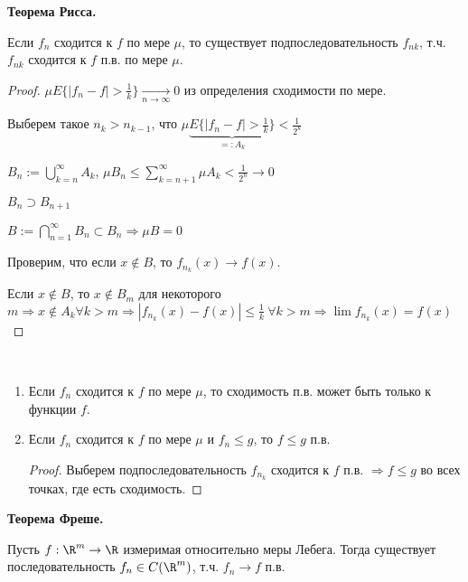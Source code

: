 \begin{theorem}
    \textbf{Теорема Рисса.}

    Если $f_n$ сходится к $f$ по мере $\mu$, то существует подпоследовательность
    $f_{nk}$, т.ч. $f_{nk}$  сходится к $f$ п.в. по мере $\mu$.
\end{theorem}

\begin{proof}
    $\mu E\{|f_n - f|> \frac{1}{k}\}\underset{n\rightarrow \infty}{\rightarrow}0$
    из определения сходимости по мере.

    Выберем такое $n_k>n_{k-1}$, что $\mu \underbrace{E\{|f_n - f|> \frac{1}{k}\}}_{=:A_k}<\frac{1}{2^k}$

    $B_n:= \bigcup\limits_{k=n}^\infty A_k$, $\mu B_n \leq \sum \limits_{k=n+1}^\infty \mu A_k < \frac{1}{2^n}\rightarrow 0$

    $B_n \supset B_{n+1}$

    $B:= \bigcap \limits_{n=1}^\infty B_n\subset B_n\Rightarrow \mu B=0$

    Проверим, что если $x\not \in B$, то $f_{n_k}(x)\rightarrow f(x)$.

    Если $x\not \in B$, то $x\not \in B_m$ для некоторого $m\Rightarrow x\not \in A_k\forall k > m
    \Rightarrow |f_{n_k}(x)-f(x)|\leq \frac{1}{k}\ \forall k > m\Rightarrow \lim f_{n_k}(x)=f(x)$
\end{proof}

\begin{corollary}~
    \begin{enumerate}
        \item Если $f_n$ сходится к $f$ по мере $\mu$, то сходимость п.в. может быть только
        к функции $f$.

        \item Если $f_n$ сходится к $f$ по мере $\mu$ и $f_n \leq g$, то $f\leq g$ п.в.
        
        \begin{proof}
            Выберем подпоследовательность $f_{n_k}$ сходится к $f$ п.в. $\Rightarrow f\leq g$ во всех 
            точках, где есть сходимость.
        \end{proof}
    \end{enumerate}
\end{corollary}

\begin{theorem}
    \textbf{Теорема Фреше.}

    Пусть $f:\R^m \rightarrow \R$ измеримая относительно меры Лебега. 
    Тогда существует последовательность $f_n\in C(\R^m)$, т.ч. $f_n\rightarrow f$ п.в.
\end{theorem}

